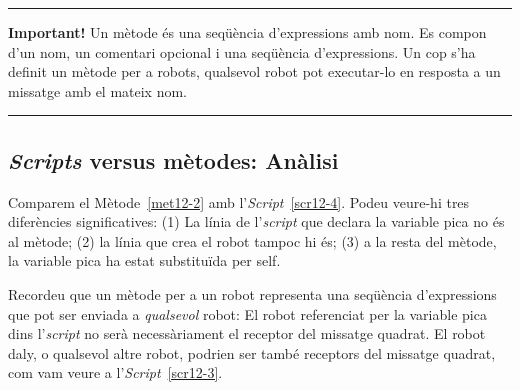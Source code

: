 \noindent
\rule{\textwidth}{2pt}
\noindent
\textbf{Important!} Un mètode és una seqüència d'expressions amb nom. Es compon d'un nom, un comentari opcional i una seqüència d'expressions. Un cop s'ha definit un mètode per a robots, qualsevol robot pot executar-lo en resposta a un missatge amb el mateix nom.\\   
\noindent
\rule{\textwidth}{2pt}

\subsection{\emph{Scripts} versus mètodes: Anàlisi}
Comparem el Mètode~\ref{met12-2} amb l'\emph{Script}~\ref{scr12-4}. Podeu veure-hi tres diferències significatives: (1) La línia de l'\emph{script} que declara la variable \textsf{pica} no és al mètode; (2) la línia que crea el robot tampoc hi és; (3) a la resta del mètode, la variable \textsf{pica} ha estat substituïda per \textsf{self}.

Recordeu que un mètode per a un robot representa una seqüència d'expressions que pot ser enviada a \emph{qualsevol} robot: El robot  referenciat per la variable \textsf{pica} dins l'\emph{script} no serà necessàriament el receptor del missatge \textsf{quadrat}. El robot \textsf{daly}, o qualsevol altre robot, podrien ser també receptors del missatge \textsf{quadrat}, com vam veure a l'\emph{Script}~\ref{scr12-3}.

